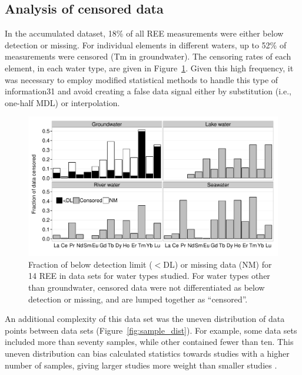 \subsection{Analysis of censored data}

In the accumulated dataset, 18\% of all REE measurements were either below detection or missing.
For individual elements in different waters, up to 52\% of measurements were censored (Tm in groundwater).
The censoring rates of each element, in each water type, are given in Figure~\ref{fig:cen_frac}.
Given this high frequency, it was necessary to employ modified statistical methods to handle this type of information31 and avoid creating a false data signal either by substitution (i.e., one-half MDL) or interpolation.

\begin{figure}[htbp]
\begin{center}
\includegraphics[width=\textwidth]{Ch3_figures/REE-waters-nonDet-type.pdf}
\caption{Fraction of below detection limit ($<$DL) or missing data (NM) for 14 REE in data sets for water types studied. For water types other than groundwater, censored data were not differentiated as below detection or missing, and are lumped together as ``censored''.}\label{fig:cen_frac}
\end{center}
\end{figure}


An additional complexity of this data set was the uneven distribution of data points between data sets (Figure~\ref{fig:sample_dist}).
For example, some data sets included more than seventy samples, while other contained fewer than ten.
This uneven distribution can bias calculated statistics towards studies with a higher number of samples, giving larger studies more weight than smaller studies \citep{Singh_JAWMA_2013}.

